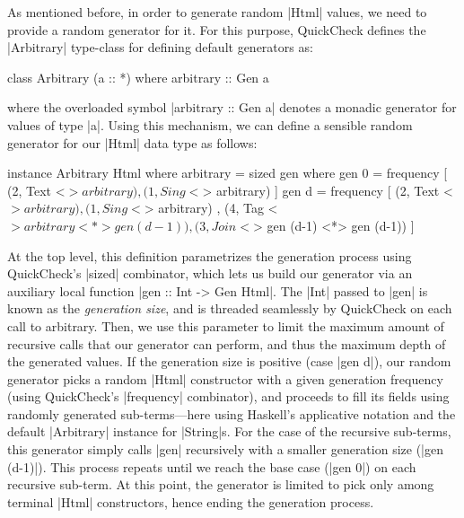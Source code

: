 %
As mentioned before, in order to generate random |Html| values, we need to
provide a random generator for it.
%
For this purpose, QuickCheck defines the |Arbitrary| type-class for defining
default generators as:

\begin{code}
class Arbitrary (a :: *) where
  arbitrary :: Gen a
\end{code}
%
where the overloaded symbol |arbitrary :: Gen a| denotes a monadic generator for
values of type |a|.
%
Using this mechanism, we can define a sensible random generator for our |Html|
data type as follows:

\begin{code}
instance Arbitrary Html where
  arbitrary = sized gen
    where  gen 0 = frequency
             [  (2,  Text    <$> arbitrary)
             ,  (1,  Sing    <$> arbitrary) ]
           gen d = frequency
             [  (2,  Text    <$> arbitrary)
             ,  (1,  Sing    <$> arbitrary)
             ,  (4,  Tag     <$> arbitrary  <*> gen (d-1))
             ,  (3,  Join    <$> gen (d-1)  <*> gen (d-1)) ]
\end{code} %
%
At the top level, this definition parametrizes the generation process using
QuickCheck's |sized| combinator, which lets us build our generator via an
auxiliary local function |gen :: Int -> Gen Html|.
%
The |Int| passed to |gen| is known as the \emph{generation size}, and is
threaded seamlessly by QuickCheck on each call to arbitrary.
%
Then, we use this parameter to limit the maximum amount of recursive calls that
our generator can perform, and thus the maximum depth of the generated values.
%
If the generation size is positive (case |gen d|), our random generator picks a
random |Html| constructor with a given generation frequency (using QuickCheck's
|frequency| combinator), and proceeds to fill its fields using randomly
generated sub-terms---here using Haskell's applicative notation
\cite{Mcbride2008} and the default |Arbitrary| instance for |String|s.
%
For the case of the recursive sub-terms, this generator simply calls |gen|
recursively with a smaller generation size (|gen (d-1)|).
%
This process repeats until we reach the base case (|gen 0|) on each recursive
sub-term.
%
At this point, the generator is limited to pick only among terminal |Html|
constructors, hence ending the generation process.



